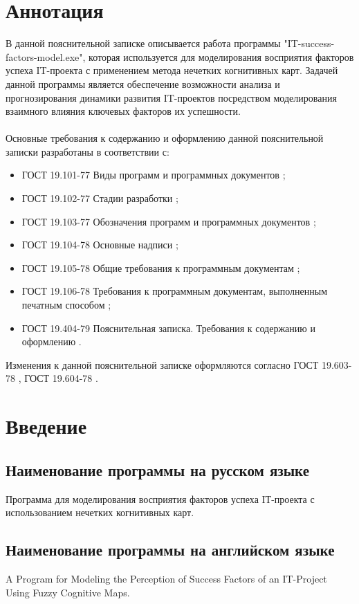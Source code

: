 \documentclass{article}
\begin{document}
    \section {Аннотация}
    В данной пояснительной записке описывается работа программы "{}IT-success-factors-model.exe"{}, которая используется для моделирования восприятия факторов успеха IT-проекта с применением метода нечетких когнитивных карт. Задачей данной программы является обеспечение возможности анализа и прогнозирования динамики развития IT-проектов посредством моделирования взаимного влияния ключевых факторов их успешности.\\
    ~\\
    Основные требования к содержанию и оформлению данной пояснительной записки разработаны в соответствии с:
    \begin{itemize}
        \item ГОСТ 19.101-77 Виды программ и программных документов \cite{litlink1};
        \item ГОСТ 19.102-77 Стадии разработки \cite{litlink2};
        \item ГОСТ 19.103-77 Обозначения программ и программных документов \cite{litlink3};
        \item ГОСТ 19.104-78 Основные надписи \cite{litlink4};
        \item ГОСТ 19.105-78 Общие требования к программным документам \cite{litlink5};
        \item ГОСТ 19.106-78 Требования к программным документам, выполненным печатным
        способом \cite{litlink6};
        \item ГОСТ 19.404-79 Пояснительная записка. Требования к содержанию и оформлению \cite{litlink7}.
    \end{itemize}
    Изменения к данной пояснительной записке оформляются согласно ГОСТ 19.603-78 \cite{litlink8}, ГОСТ 19.604-78 \cite{litlink9}.
    \newpage
    \section {Введение}
    \subsection {Наименование программы на русском языке}
    Программа для моделирования восприятия факторов успеха IТ-проекта с использованием нечетких когнитивных карт.
    \subsection {Наименование программы на английском языке}
    A Program for Modeling the Perception of Success Factors of an IT-Project Using Fuzzy Cognitive Maps.
\end{document}
